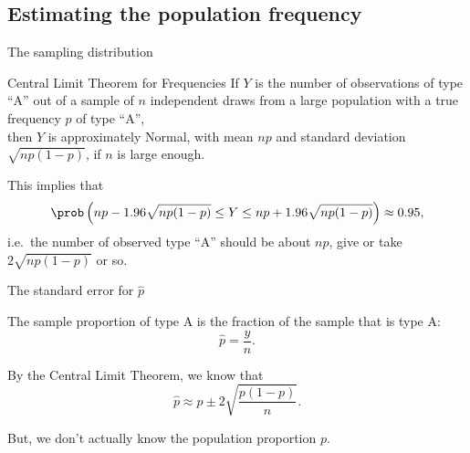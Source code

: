 \subsection{Estimating the population frequency}

\begin{frame}{The sampling distribution}

    \begin{block}{Central Limit Theorem for Frequencies}
        If $Y$ is the number of observations of type ``A''
        out of a sample of $n$ independent draws
        from a large population with a true frequency $p$ of type ``A'', \\
        then $Y$ is \alert{approximately Normal},
        with mean $np$ and standard deviation $\sqrt{n p (1-p)}$,
        if $n$ is large enough.
    \end{block}

    \vspace{2em}

    This implies that 
    \[ \prob\left( np - 1.96 \sqrt{n p(1-p)} \le Y \le np + 1.96 \sqrt{n p (1-p)} \right) \approx 0.95 , \]
    i.e.\ the number of observed type ``A'' should be about $np$, give or take $2 \sqrt{n p (1-p)}$ or so.

    \vspace{2em}


\end{frame}

\begin{frame}{The standard error for $\hat p$}

    The \alert{sample proportion} of type A is
    the fraction of the sample that is type A:
    \[ \hat p = \frac{y}{n} . \]

    \vspace{2em}

    By the Central Limit Theorem, we know that 
    \[  \hat p \approx p \pm 2 \sqrt{ \frac{ p(1-p) }{ n } } .\]

    \vspace{2em}

    But, we don't actually know the population proportion $p$.

\end{frame}


